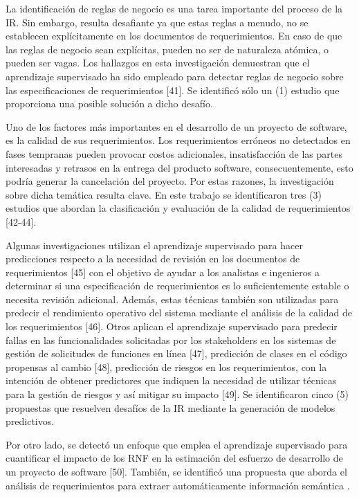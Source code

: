 \documentclass[journal]{IEEEtran}
\begin{document}
La identificación de reglas de negocio es una tarea importante del proceso de la IR. Sin embargo, resulta desafiante ya que estas reglas a menudo, no se establecen explícitamente en los documentos de requerimientos. En caso de que las reglas de negocio sean explícitas, pueden no ser de naturaleza atómica, o pueden ser vagas. Los hallazgos en esta investigación demuestran que el aprendizaje supervisado ha sido empleado para detectar reglas de negocio sobre las especificaciones de requerimientos \cite{sharma2014automated}[41]. Se identificó sólo un (1) estudio que proporciona una posible solución a dicho desafío.

Uno de los factores más importantes en el desarrollo de un proyecto de software, es la calidad de sus requerimientos. Los requerimientos erróneos no detectados en fases tempranas pueden provocar costos adicionales, insatisfacción de las partes interesadas y retrasos en la entrega del producto software, consecuentemente, esto podría generar la cancelación del proyecto. Por estas razones, la investigación sobre dicha temática resulta clave. En este trabajo se identificaron tres (3) estudios que abordan la clasificación y evaluación de la calidad de requerimientos \cite{Parra2015180,Hayes2015,Hussain2007}[42-44]. 

Algunas investigaciones utilizan el aprendizaje supervisado para hacer predicciones respecto a la necesidad de revisión en los documentos de requerimientos \cite{del2017stability}[45] con el objetivo de ayudar a los analistas e ingenieros a determinar si una especificación de requerimientos es lo suficientemente estable o necesita revisión adicional. Además, estas técnicas también son utilizadas para predecir el rendimiento operativo del sistema mediante el análisis de la calidad de los requerimientos \cite{dargan2016systems}[46]. Otros aplican el aprendizaje supervisado para predecir fallas en las funcionalidades solicitadas por los stakeholders en los sistemas de gestión de solicitudes de funciones en línea \cite{fitzgerald2012early}[47], predicción de clases en el código propensas al cambio \cite{malhotra2017exploratory}[48], predicción de riesgos en los requerimientos, con la intención de obtener predictores que indiquen la necesidad de utilizar técnicas para la gestión de riesgos y así mitigar su impacto \cite{del2011requirement}[49]. Se identificaron cinco (5) propuestas que resuelven desafíos de la IR mediante la generación de modelos predictivos. 

Por otro lado, se detectó un enfoque que emplea el aprendizaje supervisado para cuantificar el impacto de los RNF en la estimación del esfuerzo de desarrollo de un proyecto de software \cite{Abdukalykov2011158}[50]. También, se identificó una propuesta que aborda el análisis de requerimientos para extraer automáticamente información semántica \cite{Wang2016}. 
\end{document}
